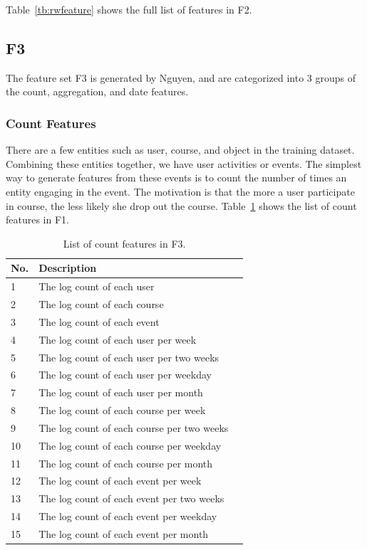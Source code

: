 Table~\ref{tb:rwfeature} shows the full list of features in F2.

\subsection{F3}
The feature set F3 is generated by Nguyen, and are categorized into 3 groups of the count, aggregation, and date features.

\subsubsection{Count Features}
There are a few entities such as user, course, and object in the training dataset.  Combining these entities together, we have user activities or events.  The simplest way to generate features from these events is to count the number of times an entity engaging in the event. The motivation is that the more a user participate in course, the less likely she drop out the course. Table~\ref{tb:tnfeature1} shows the list of count features in F1. 

\begin{center}
	\begin{table}[ht]
		\begin{minipage}{0.5 \textwidth}
			{
				\small
				\hfill{}
				\begin{tabular}{|l|l|l|}
					\hline
					\textbf{No.}	&\textbf{Description}\tabularnewline \hline
					1 			& The log count of each user \tabularnewline
					2 			& The log count of each course \tabularnewline
					3			& The log count of each event \tabularnewline
					4 			& The log count of each user per week \tabularnewline
					5 			& The log count of each user per two weeks \tabularnewline
					6 			& The log count of each user per weekday \tabularnewline
					7 			& The log count of each user per month\tabularnewline
					8 			& The log count of each course per week \tabularnewline
					9 			& The log count of each course per two weeks \tabularnewline
					10 			& The log count of each course per weekday\tabularnewline
					11 			& The log count of each course per month \tabularnewline
					12 			& The log count of each event per week \tabularnewline
					13 			& The log count of each event per two weeks \tabularnewline
					14 			& The log count of each event per weekday \tabularnewline
					15 			& The log count of each event per month \tabularnewline
					\hline
				\end{tabular}
			}
			\hfill{}
			\caption{List of count features in F3.}
			\label{tb:tnfeature1}
		\end{minipage}
	\end{table}
\end{center}

